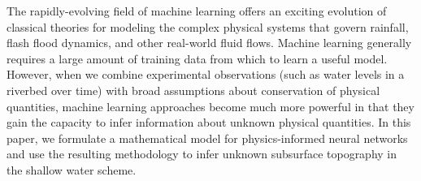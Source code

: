 The rapidly-evolving field of machine learning offers an exciting evolution of classical theories for 
modeling the complex physical systems that govern rainfall, flash flood dynamics, and other real-world fluid flows. 
Machine learning generally requires a large amount of training data from which to learn a useful model. However, 
when we combine experimental observations (such as water levels in a riverbed over time) with broad assumptions
about conservation of physical quantities, machine learning approaches become much more powerful in that they gain 
the capacity to infer information about unknown physical quantities. In this paper, we formulate a mathematical
model for physics-informed neural networks and use the resulting methodology to infer unknown subsurface topography 
in the shallow water scheme.